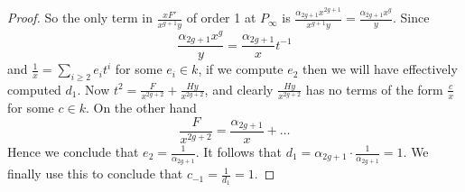 \documentclass[draft, 11pt]{article} %
\theoremstyle{plain}
\theoremstyle{remark}
\begin{document}
\begin{proof}
So the only term in $\frac{xF'}{x^{g+1}y}$ of order 1 at $P_\infty$ is $\frac{\alpha_{2g+1}x^{2g+1}}{x^{g+1}y} = \frac{\alpha_{2g+1}x^{g}}{y}$.
Since
\[
\frac{\alpha_{2g+1}x^g}{y} = \frac{\alpha_{2g+1}}{x}t^{-1}
\]
and $\frac{1}{x} = \sum_{i\geq 2}e_it^i$ for some $e_i \in k$, if we compute $e_2$ then we will have effectively computed $d_1$.
Now $t^2 = \frac{F }{x^{2g+2}}+ \frac{Hy}{x^{2g+2}}$, and clearly $\frac{Hy}{x^{2g+2}}$ has no terms of the form $\frac{c}{x}$ for some $c \in k$.
On the other hand
\[
\frac{F}{x^{2g+2}} = \frac{\alpha_{2g+1}}{x} + \ldots
\]
Hence we conclude that $e_2 = \frac{1}{\alpha_{2g+1}}$.
It follows that $d_1 = \alpha_{2g+1} \cdot \frac{1}{\alpha_{2g+1}} = 1$.
We finally use this to conclude that $c_{-1} = \frac{1}{d_{1}} = 1$.




\end{proof}
\end{document}
